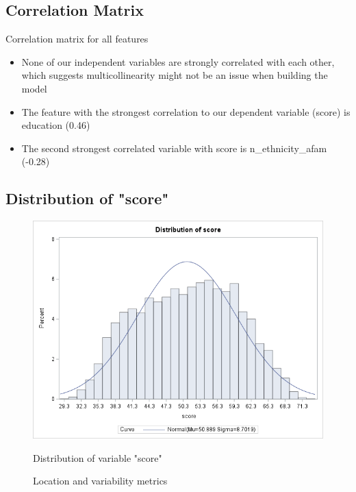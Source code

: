 \documentclass[12pt]{article}
\begin{document}
\subsection{Correlation Matrix}
\begin{table}[h]
    \centering
    \renewcommand{\arraystretch}{1.5} %
    \resizebox{1.1\textwidth}{!}{%
     }
    \caption{Correlation matrix for all features}
    \label{tab:corr_matrix}
\end{table}
\newpage
\begin{itemize}
    \item None of our independent variables are strongly correlated with each other, which suggests multicollinearity might not be an issue when building the model
    \item The feature with the strongest correlation to our dependent variable (score) is education (0.46)
    \item The second strongest correlated variable with score is n\_ethnicity\_afam (-0.28)
\end{itemize}

\subsection{Distribution of "score"}

\begin{figure}[h]
    \centering
    \begin{minipage}[t]{0.65\textwidth}
        \vspace{0pt}
        \centering
        \includegraphics[width=\textwidth]{images/score_hist.png}
        \caption{Distribution of variable "score"}
        \label{fig:score_dist}
    \end{minipage}\hfill
    \begin{minipage}[t]{0.3\textwidth}
        \vspace{15pt}
        \centering
        
        \caption{Location and variability metrics}
        \label{fig:score_measures}
    \end{minipage}
    \label{fig:score_fig}
\end{figure}
\end{document}
